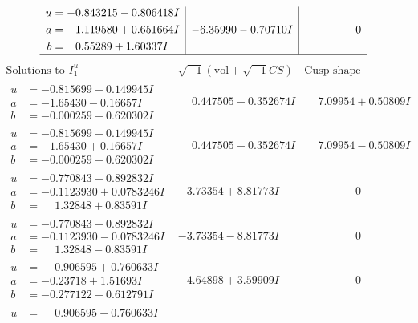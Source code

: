 \documentclass[1p]{elsarticle_modified}
\theoremstyle{definition}
\newcommand{\I}{\sqrt{-1}}
\begin{document}
$$\begin{array}{c|c|c}
\begin{aligned}
u &= -0.843215 - 0.806418 I \\
a &= -1.119580 + 0.651664 I \\
b &= \phantom{-}0.55289 + 1.60337 I\end{aligned}
 & -6.35990 - 0.70710 I & \phantom{-0.000000 } 0\\
 \hline 
 \end{array}$$\newpage$$\begin{array}{c|c|c}  
\text{Solutions to }I^u_{1}& \I (\text{vol} + \sqrt{-1}CS) & \text{Cusp shape}\\
 \hline 
\begin{aligned}
u &= -0.815699 + 0.149945 I \\
a &= -1.65430 - 0.16657 I \\
b &= -0.000259 - 0.620302 I\end{aligned}
 & \phantom{-}0.447505 - 0.352674 I & \phantom{-}7.09954 + 0.50809 I \\ \hline\begin{aligned}
u &= -0.815699 - 0.149945 I \\
a &= -1.65430 + 0.16657 I \\
b &= -0.000259 + 0.620302 I\end{aligned}
 & \phantom{-}0.447505 + 0.352674 I & \phantom{-}7.09954 - 0.50809 I \\ \hline\begin{aligned}
u &= -0.770843 + 0.892832 I \\
a &= -0.1123930 + 0.0783246 I \\
b &= \phantom{-}1.32848 + 0.83591 I\end{aligned}
 & -3.73354 + 8.81773 I & \phantom{-0.000000 } 0 \\ \hline\begin{aligned}
u &= -0.770843 - 0.892832 I \\
a &= -0.1123930 - 0.0783246 I \\
b &= \phantom{-}1.32848 - 0.83591 I\end{aligned}
 & -3.73354 - 8.81773 I & \phantom{-0.000000 } 0 \\ \hline\begin{aligned}
u &= \phantom{-}0.906595 + 0.760633 I \\
a &= -0.23718 + 1.51693 I \\
b &= -0.277122 + 0.612791 I\end{aligned}
 & -4.64898 + 3.59909 I & \phantom{-0.000000 } 0 \\ \hline\begin{aligned}
u &= \phantom{-}0.906595 - 0.760633 I \\

\end{aligned}
\end{array}$$
\end{document}
